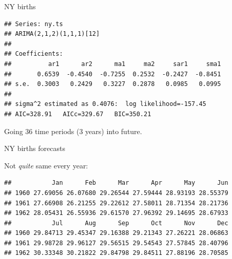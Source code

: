 \begin{frame}[fragile]{NY births}

\begin{knitrout}
\color{fgcolor}\begin{kframe}
\begin{alltt}
\hlkwb{=}
\end{alltt}
\begin{verbatim}
## Series: ny.ts 
## ARIMA(2,1,2)(1,1,1)[12]                    
## 
## Coefficients:
##          ar1      ar2      ma1     ma2     sar1     sma1
##       0.6539  -0.4540  -0.7255  0.2532  -0.2427  -0.8451
## s.e.  0.3003   0.2429   0.3227  0.2878   0.0985   0.0995
## 
## sigma^2 estimated as 0.4076:  log likelihood=-157.45
## AIC=328.91   AICc=329.67   BIC=350.21
\end{verbatim}
\begin{alltt}
\hlkwb{=}\hlstd{=}\hlstd{)}
\end{alltt}
\end{kframe}
\end{knitrout}

Going 36 time periods (3 years) into future.

\end{frame}

\begin{frame}[fragile]{NY births forecasts}
  
Not \emph{quite} same every year:

{\small
\begin{knitrout}
\color{fgcolor}\begin{kframe}
\begin{alltt}
\hlopt{$}
\end{alltt}
\begin{verbatim}
##           Jan      Feb      Mar      Apr      May      Jun
## 1960 27.69056 26.07680 29.26544 27.59444 28.93193 28.55379
## 1961 27.66908 26.21255 29.22612 27.58011 28.71354 28.21736
## 1962 28.05431 26.55936 29.61570 27.96392 29.14695 28.67933
##           Jul      Aug      Sep      Oct      Nov      Dec
## 1960 29.84713 29.45347 29.16388 29.21343 27.26221 28.06863
## 1961 29.98728 29.96127 29.56515 29.54543 27.57845 28.40796
## 1962 30.33348 30.21822 29.84798 29.84511 27.88196 28.70585
\end{verbatim}
\end{kframe}
\end{knitrout}
}
  
\end{frame}


